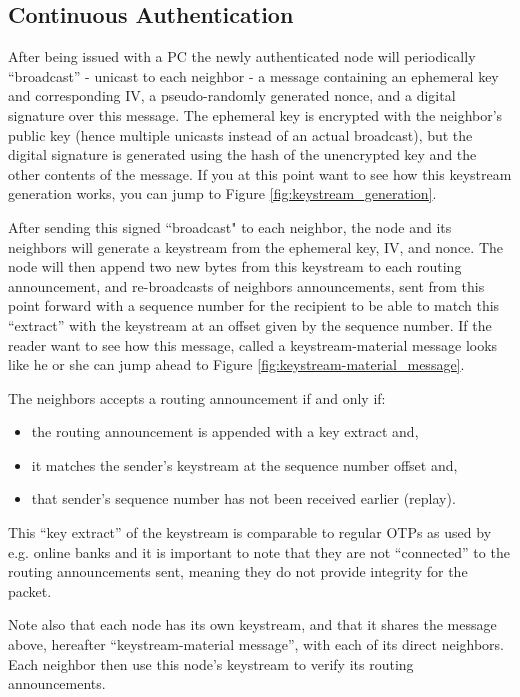 \subsection{Continuous Authentication}
After being issued with a \ac{PC} the newly authenticated node will periodically
``broadcast'' - unicast to each neighbor - a message containing an ephemeral key
and corresponding \ac{IV}, a pseudo-randomly generated nonce, and a digital
signature over this message. The ephemeral key is encrypted with the neighbor's
public key (hence multiple unicasts instead of an actual broadcast), but the
digital signature is generated using the hash of the unencrypted key and the
other contents of the message. If you at this point want to see how this
keystream generation works, you can jump to Figure
\ref{fig:keystream_generation}.

After sending this signed ``broadcast" to each neighbor, the node and its
neighbors will generate a keystream from the ephemeral key, \ac{IV}, and nonce.
The node will then append two new bytes from this keystream to each routing
announcement, and re-broadcasts of neighbors announcements, sent from this point
forward with a sequence number for the recipient to be able to match this
``extract'' with the keystream at an offset given by the sequence number. If the
reader want to see how this message, called a keystream-material message looks
like he or she can jump ahead to Figure \ref{fig:keystream-material_message}.

The neighbors accepts a routing announcement if and only if:

\begin{itemize}
  \item the routing announcement is appended with a key extract and,
  \item it matches the sender's keystream at the sequence number offset and,
  \item that sender's sequence number has not been received earlier (replay).
\end{itemize}

This ``key extract'' of the keystream is comparable to regular \acp{OTP} as used
by e.g. online banks and it is important to note that they are not ``connected''
to the routing announcements sent, meaning they do not provide integrity for the
packet.

Note also that each node has its own keystream, and that it shares the message
above, hereafter ``keystream-material message'', with each of its direct
neighbors. Each neighbor then use this node's keystream to verify its routing
announcements.

